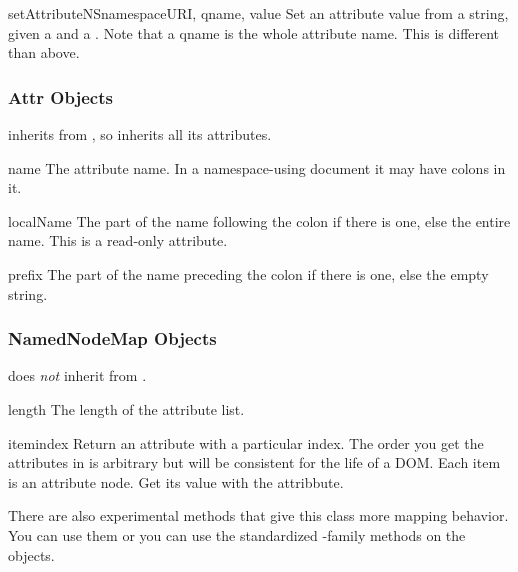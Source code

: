 \begin{methoddesc}[Element]{setAttributeNS}{namespaceURI, qname, value}
Set an attribute value from a string, given a  and a
.  Note that a qname is the whole attribute name.  This is
different than above.
\end{methoddesc}


\subsubsection{Attr Objects \label{dom-attr-objects}}

 inherits from , so inherits all its
attributes.

\begin{memberdesc}[Attr]{name}
The attribute name.  In a namespace-using document it may have colons
in it.
\end{memberdesc}

\begin{memberdesc}[Attr]{localName}
The part of the name following the colon if there is one, else the
entire name.  This is a read-only attribute.
\end{memberdesc}

\begin{memberdesc}[Attr]{prefix}
The part of the name preceding the colon if there is one, else the
empty string.
\end{memberdesc}


\subsubsection{NamedNodeMap Objects \label{dom-attributelist-objects}}

 does \emph{not} inherit from .

\begin{memberdesc}[NamedNodeMap]{length}
The length of the attribute list.
\end{memberdesc}

\begin{methoddesc}[NamedNodeMap]{item}{index}
Return an attribute with a particular index.  The order you get the
attributes in is arbitrary but will be consistent for the life of a
DOM.  Each item is an attribute node.  Get its value with the
 attribbute.
\end{methoddesc}

There are also experimental methods that give this class more mapping
behavior.  You can use them or you can use the standardized
-family methods on the  objects.


